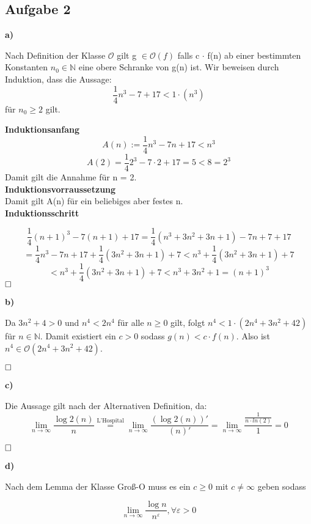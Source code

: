 \documentclass[a4paper,graphics,11pt]{article}
\newcommand{\aufgabe}[1]{\subsection*{Aufgabe #1}}
\begin{document}
\aufgabe{2} 
\textbf{a)}

Nach Definition der Klasse $\mathcal{O}$ gilt g $\in \mathcal{O}(f)$ falls c $\cdot$ f(n) ab einer bestimmten Konstanten $n_0 \in \mathbb{N}$ eine obere Schranke von g(n) ist. Wir beweisen durch Induktion, dass die Aussage:
$$
	\frac{1}{4}n^3-7+17 < 1\cdot(n^3)
$$
für $n_0 \ge 2$ gilt.\\

\begin{minipage}{1\linewidth}
	\textbf{Induktionsanfang}\\
	$$
		A(n) := \frac{1}{4}n^3-7n+17 < n^3  
	$$$$
		A(2) = \frac{1}{4} 2^3-7\cdot2+17 = 5 < 8 = 2^3
	$$
	Damit gilt die Annahme für n = 2.\\
	
	\textbf{Induktionsvorraussetzung}\\
	
	Damit gilt A(n) für ein beliebiges aber festes n.\\
	
	\textbf{Induktionsschritt}
	
	$$
	\frac{1}{4}(n+1)^3-7(n+1)+17 = \frac{1}{4}(n^3+3n^2+3n+1)-7n+7+17
	$$$$
	=\frac{1}{4}n^3-7n+17+\frac{1}{4}(3n^2+3n+1)+7 < n^3+\frac{1}{4}(3n^2+3n+1)+7
	$$$$
	< n^3+\frac{1}{4}(3n^2+3n+1)+7 < n^3 +3n^2+1 = (n+1)^3
	$$
	$\hfill\square$
	
\end{minipage}

\textbf{b)}

Da $3n^2+4 > 0$ und $ n^4 < 2n^4 $ für alle $n \geq 0$ gilt, folgt
$n^4 < 1 \cdot(2n^4+3n^2+42)$ für $n \in \mathbb{N}$. Damit existiert ein $c > 0$ sodass $g(n) < c \cdot f(n)$. Also ist $n^4 \in \mathcal{O}(2n^4+3n^2+42)$.

$\hfill\square$



\textbf{c)}

Die Aussage gilt nach der Alternativen Definition, da:
$$
\lim_{n\rightarrow\infty} \frac{\log2(n)}{n} \overset{\text{L'Hospital}}{=} \lim_{n\rightarrow\infty} \frac{(\log2(n))'}{(n)'} = \lim_{n\rightarrow\infty} \frac{\frac{1}{n\cdot ln(2)}}{1} = 0
$$

$\hfill\square$

\newpage

\textbf{d)}

Nach dem Lemma der Klasse Groß-O muss es ein $c \geq 0$ mit $c \neq \infty$ geben sodass

$$
\lim_{n\rightarrow\infty} \frac{\log n}{n^\varepsilon}, \forall \varepsilon > 0
$$
\end{document}
